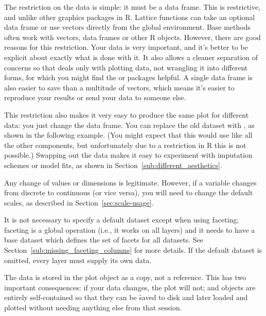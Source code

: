 The restriction on the data is simple: it must be a data frame.  This is restrictive, and unlike other graphics packages in R.  Lattice functions can take an optional data frame or use vectors directly from the global environment.  Base methods often work with vectors, data frames or other R objects.  However, there are good reasons for this restriction. Your data is very important, and it's better to be explicit about exactly what is done with it.  It also allows a cleaner separation of concerns so that \ggplot deals only with plotting data, not wrangling it into different forms, for which you might find the  or  packages helpful.  A single data frame is also easier to save than a multitude of vectors, which means it's easier to reproduce your results or send your data to someone else.  


This restriction also makes it very easy to produce the same plot for different data: you just change the data frame.  You can replace the old dataset with \code{\%+\%}, as shown in the following example.  (You might expect that this would use \code{+} like all the other components, but unfortunately due to a restriction in R this is not possible.)  Swapping out the data makes it easy to experiment with imputation schemes or model fits, as shown in Section~\ref{sub:different_aesthetics}. 

% 


\noindent Any change of values or dimensions is legitimate.  However, if a variable changes from discrete to continuous (or vice versa), you will need to change the default scales, as described in Section~\ref{sec:scale-usage}.  

It is not necessary to specify a default dataset except when using faceting; faceting is a global operation (i.e., it works on all layers) and it needs to have a base dataset which defines the set of facets for all datasets.  See Section~\ref{sub:missing_faceting_columns} for more details.  If the default dataset is omitted, every layer must supply its own data.

The data is stored in the plot object as a copy, not a reference.  This has two important consequences: if your data changes, the plot will not; and \ggplot objects are entirely self-contained so that they can be \f{save}d to disk and later \f{load}ed and plotted without needing anything else from that session.

